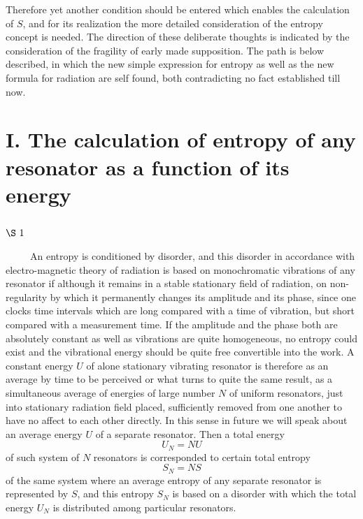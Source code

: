 \documentclass{article}
\begin{document}
Therefore yet another condition should be entered 
which enables the calculation of $S$, and for its realization 
the more detailed consideration of the entropy concept is needed. 
The direction of these deliberate thoughts is indicated by 
the consideration of the fragility of early made supposition.
The path is below described, 
in which the new simple expression for entropy 
as well as the new formula for radiation are self found, 
both contradicting no fact established till now.

\section*{
{\bf I. The calculation of entropy of any resonator 
as a function of its energy}}

\vspace{0.5cm}
\subsection*{
{\bf $\S~1$}}
\vspace{0.3cm}

~~~~~An entropy is conditioned by disorder, and this disorder 
in accordance with electro-magnetic theory of radiation 
is based on monochromatic vibrations of any resonator if although 
it remains in a stable stationary field of radiation, on non-regularity 
by which it permanently changes its amplitude and its phase, 
since one clocks time intervals which are long compared with a time 
of vibration, but short compared with a measurement time.
If the amplitude and the phase both are absolutely constant as well as 
vibrations are quite homogeneous, no entropy could exist 
and the vibrational energy should be quite free convertible into the work.
A constant energy $U$ of alone stationary vibrating resonator is therefore 
as an average by time to be perceived or what turns to quite the same result, 
as a simultaneous average of energies of large number $N$ 
of uniform resonators, just into stationary radiation field placed, 
sufficiently removed from one another to have no affect to each other directly.
In this sense in future we will speak about an average energy $U$ 
of a separate resonator. Then a total energy
\begin{equation}
U_N = NU
\end{equation}
of such system of $N$ resonators is corresponded to certain total entropy 
\begin{equation}
S_N = NS
\end{equation}
of the same system where an average entropy of any separate resonator 
is represented by $S$, and this entropy $S_N$ is based on a disorder 
with which the total energy $U_N$ is distributed among particular resonators.
\end{document}

